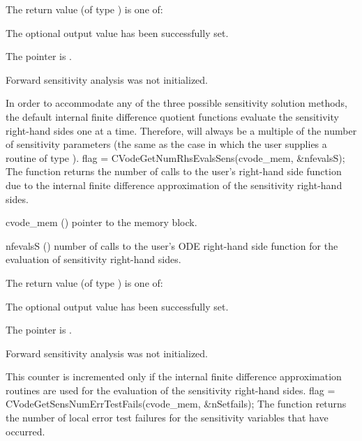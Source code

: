 {
  The return value  (of type ) is one of:
  \begin{args}
  \item[\Id{CV\_SUCCESS}] 
    The optional output value has been successfully set.
  \item[\Id{CV\_MEM\_NULL}]
    The  pointer is .
  \item[\Id{CV\_NO\_SENS}]
    Forward sensitivity analysis was not initialized.
  \end{args}
}
{
  In order to accommodate any of the three possible sensitivity solution methods,
  the default internal 
  finite difference quotient functions evaluate the sensitivity right-hand sides 
  one at a time. Therefore,  will always be a multiple of the
  number of sensitivity parameters (the same as the case in which the user supplies
  a routine of type ).
}
{
  flag = CVodeGetNumRhsEvalsSens(cvode\_mem, \&nfevalsS);
}
{
  The function  returns the number of calls to the
  user's right-hand side function due to the internal finite difference approximation
  of the sensitivity right-hand sides.
}
{
  \begin{args}
  \item[cvode\_mem] ()
    pointer to the {\cvodes} memory block.
  \item[nfevalsS] ()
    number of calls to the user's ODE right-hand side function for the evaluation of
    sensitivity right-hand sides.
  \end{args}
}
{
  The return value  (of type ) is one of:
  \begin{args}
  \item[\Id{CV\_SUCCESS}] 
    The optional output value has been successfully set.
  \item[\Id{CV\_MEM\_NULL}]
    The  pointer is .
  \item[\Id{CV\_NO\_SENS}]
    Forward sensitivity analysis was not initialized.
  \end{args}
}
{
  This counter is incremented only if the internal finite difference approximation
  routines are used for the evaluation of the sensitivity right-hand sides.
}
{
  flag = CVodeGetSensNumErrTestFails(cvode\_mem, \&nSetfails);
}
{
  The function  returns the number of local
  error test failures for the sensitivity variables that have occurred.
}
